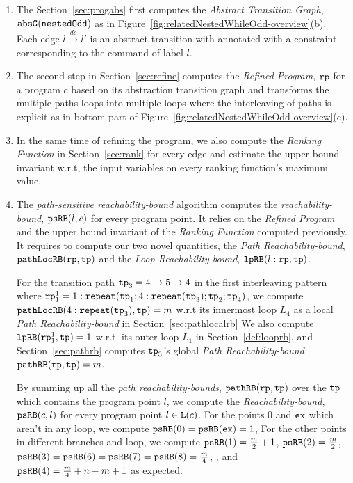 \begin{enumerate}
    \item  The Section~\ref{sec:progabs} first 
    computes the \emph{Abstract Transition Graph}, $\mathtt{abs}{\mathtt{G}}(\mathtt{nestedOdd})$ as in Figure~\ref{fig:relatedNestedWhileOdd-overview}(b).
    Each edge $l \xrightarrow{dc} l'$ is an abstract transition with annotated with a constraint corresponding to the command of label $l$.
    \item The second step in Section~\ref{sec:refine}
    computes the \emph{Refined Program}, $\mathtt{rp}$ for a program $c$ based on 
    its abstraction transition graph and transforms the multiple-paths loops
    into multiple loops where
    the interleaving of paths is explicit as in bottom part of Figure~\ref{fig:relatedNestedWhileOdd-overview}(c).
    \item In the same time of refining the program, we also compute the \emph{Ranking Function} in Section~\ref{sec:rank}
    for every edge 
    and estimate the upper bound invariant w.r.t, the input variables on every ranking function's maximum value.
    \item The \emph{path-sensitive reachability-bound} algorithm computes the \emph{reachability-bound}, $\mathtt{psRB}(l, c)$ for every program point.
    It relies on the \emph{Refined Program} and the upper bound invariant of the \emph{Ranking Function} computed previously.
    It requires to compute our two novel quantities, the \emph{Path Reachability-bound}, $\mathtt{pathLocRB}(\mathtt{rp}, \mathtt{tp})$ and the \emph{Loop Reachability-bound}, $\mathtt{lpRB}(l: \mathtt{rp}, \mathtt{tp})$.

    For the transition path $\mathtt{tp}_3 = 4 \to 5 \to 4$ in the first interleaving pattern where $\mathtt{rp}_1^1 = 1: \mathtt{repeat}(\mathtt{tp}_1; 4:\mathtt{repeat}(\mathtt{tp}_3); \mathtt{tp}_2; \mathtt{tp}_4)$,
    we compute $\mathtt{pathLocRB}(4:\mathtt{repeat}(\mathtt{tp}_3), \mathtt{tp}) = m$ w.r.t its innermost loop $L_4$ as a local \emph{Path Reachability-bound} in Section~\ref{sec:pathlocalrb}
    We also compute $\mathtt{lpRB}(\mathtt{rp}_1^1, \mathtt{tp}) = 1$ w.r.t. its outer loop $L_1$ in Section~\ref{def:looprb},
    and Section~\ref{sec:pathrb} computes $\mathtt{tp}_3$'s global \emph{Path Reachability-bound} $\mathtt{pathRB}(\mathtt{rp}, \mathtt{tp}) = m$.
   
    By summing up all the \emph{path reachability-bounds}, $\mathtt{pathRB}(\mathtt{rp}, \mathtt{tp})$ over the $\mathtt{tp}$ which contains the program point $l$, we compute the \emph{Reachability-bound}, $\mathtt{psRB}(c, l)$ for every program point $l \in \mathtt{L}(c)$.
    For the points $0$ and $\mathtt{ex}$ which aren't in any loop, we compute $\mathtt{psRB}(0) = \mathtt{psRB}(\mathtt{ex}) = 1$,
    For the other points in different branches and loop, we compute $\mathtt{psRB}(1) = \frac{m}{2} + 1$,
    $\mathtt{psRB}(2) = \frac{m}{2} $, 
    $\mathtt{psRB}(3) = \mathtt{psRB}(6) = \mathtt{psRB}(7)  = \mathtt{psRB}(8) = \frac{m}{4} $,
    ,
    and $\mathtt{psRB}(4) =  \frac{m}{4} + n - m + 1$ as expected.


\end{enumerate}
